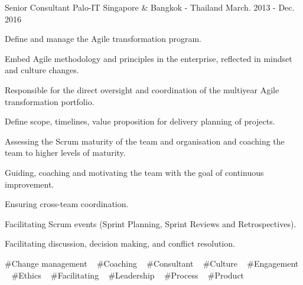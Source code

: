 \begin{cventries}
  \cventry
    {Senior Consultant} %
    {Palo-IT} %
    {Singapore \& Bangkok - Thailand} %
    {March. 2013 - Dec. 2016} %
    {
      \begin{cvitems} %
        \item {Define and manage the Agile transformation program.}
        \item {Embed Agile methodology and principles in the enterprise, reflected in mindset and culture changes.}
        \item {Responsible for the direct oversight and coordination of the multiyear Agile transformation portfolio.}
        \item {Define scope, timelines, value proposition for delivery planning of projects.}
        \item {Assessing the Scrum maturity of the team and organisation and coaching the team to higher levels of maturity.}
        \item {Guiding, coaching and motivating the team with the goal of continuous improvement.}
        \item {Ensuring cross-team coordination.}
        \item {Facilitating Scrum events (Sprint Planning, Sprint Reviews and Retrospectives).}
        \item {Facilitating discussion, decision making, and conflict resolution.}
      \end{cvitems}
    }
    {
      \#Change management ~
      \#Coaching ~
      \#Consultant ~
      \#Culture ~
      \#Engagement ~
      \#Ethics ~
      \#Facilitating ~
      \#Leadership ~
      \#Process ~
      \#Product
    }


\end{cventries}
